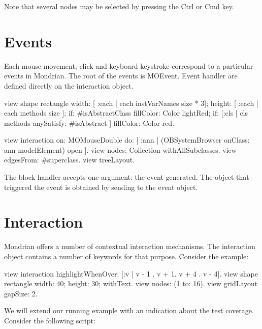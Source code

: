 \documentclass[a4paper,10pt,twoside]{book}
\begin{document}
Note that several nodes may be selected by pressing the Ctrl or Cmd key. 

\section{Events}


Each mouse movement, click and keyboard keystroke correspond to a particular events in Mondrian. The root of the events is MOEvent. Event handler are defined directly on the interaction object.  

\begin{code}{}
view shape rectangle
  width: [ :each | each instVarNames size * 3];
  height: [ :each | each methods size ];
  if: #isAbstractClass fillColor: Color lightRed;
  if: [:cls | cls methods anySatisfy: #isAbstract ] fillColor: Color red.
  
view interaction on: MOMouseDouble do: [ :ann | 
  (OBSystemBrowser onClass: ann modelElement) open
].
view nodes: Collection withAllSubclasses.
view edgesFrom: #superclass.
view treeLayout.
\end{code}

The block handler accepts one argument: the event generated. The object that triggered the event is obtained by sending  to the event object. 

\section{Interaction}
Mondrian offers a number of contextual interaction mechanisms. The interaction object contains a number of keywords for that purpose. Consider the example:

\begin{code}{}
view interaction 
  highlightWhenOver: [:v | {v - 1 . v + 1. v + 4 . v - 4}].
view shape rectangle 
  width: 40;
  height: 30;
  withText.
view nodes: (1 to: 16).
view gridLayout gapSize: 2.
\end{code}

We will extend our running example with an indication about the test coverage. Consider the following script:
\end{document}
